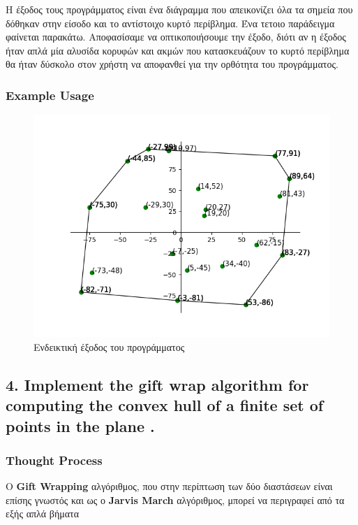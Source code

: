 \documentclass[12pt]{article}
\newenvironment{matlab}
	{\begin{figure}[H]\centering\captionsetup{justification=centering}}
	{\end{figure}}
\begin{document}
Η έξοδος τους προγράμματος είναι ένα διάγραμμα που απεικονίζει όλα τα σημεία που δόθηκαν στην είσοδο και το αντίστοιχο κυρτό περίβλημα. Ένα τετοιο παράδειγμα φαίνεται παρακάτω. Αποφασίσαμε να οπτικοποιήσουμε την έξοδο, διότι αν η έξοδος ήταν απλά μία αλυσίδα κορυφών και ακμών που κατασκευάζουν το κυρτό περίβλημα θα ήταν δύσκολο στον χρήστη να αποφανθεί για την ορθότητα του προγράμματος. \\

\subsubsection*{Example Usage}

\begin{matlab}
	\includegraphics[scale=0.7]{images/exercise3_1.png}
	\caption{Ενδεικτική έξοδος του προγράμματος}
\end{matlab}

\pagebreak

\subsection*{4. Implement the gift wrap algorithm for computing the convex hull of a finite
set of points in the plane .}

\subsubsection*{Thought Process}

Ο \textbf{Gift Wrapping} αλγόριθμος, που στην περίπτωση των δύο διαστάσεων είναι
επίσης γνωστός και ως ο \textbf{Jarvis March} αλγόριθμος, μπορεί να περιγραφεί από τα εξής
απλά βήματα \\
\end{document}
